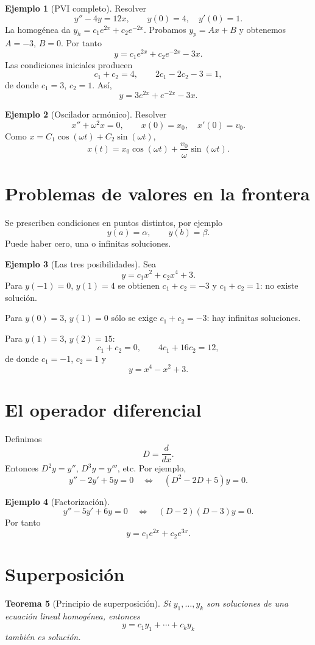 \documentclass[11pt]{article}
\newtheorem{teorema}{Teorema}[section]
\theoremstyle{definition}
\newtheorem{ejemplo}[teorema]{Ejemplo}
\begin{document}
\begin{ejemplo}[PVI completo]
Resolver
\[
y''-4y=12x,\qquad y(0)=4,\quad y'(0)=1.
\]
La homogénea da $y_h=c_1e^{2x}+c_2e^{-2x}$. Probamos $y_p=Ax+B$ y obtenemos
$A=-3$, $B=0$. Por tanto
\[
y=c_1e^{2x}+c_2e^{-2x}-3x.
\]
Las condiciones iniciales producen
\[
c_1+c_2=4,\qquad 2c_1-2c_2-3=1,
\]
de donde $c_1=3$, $c_2=1$. Así,
\[
\boxed{y=3e^{2x}+e^{-2x}-3x}.
\]
\end{ejemplo}

\begin{ejemplo}[Oscilador armónico]
Resolver
\[
x''+\omega^2x=0,\qquad x(0)=x_0,\quad x'(0)=v_0.
\]
Como $x=C_1\cos(\omega t)+C_2\sin(\omega t)$,
\[
\boxed{x(t)=x_0\cos(\omega t)+\frac{v_0}{\omega}\sin(\omega t)}.
\]
\end{ejemplo}

\section{Problemas de valores en la frontera}
Se prescriben condiciones en puntos distintos, por ejemplo
\[
y(a)=\alpha,\qquad y(b)=\beta.
\]
Puede haber cero, una o infinitas soluciones.

\begin{ejemplo}[Las tres posibilidades]
Sea
\[
y=c_1x^2+c_2x^4+3.
\]
Para $y(-1)=0$, $y(1)=4$ se obtienen $c_1+c_2=-3$ y $c_1+c_2=1$: no existe solución.

Para $y(0)=3$, $y(1)=0$ sólo se exige $c_1+c_2=-3$: hay infinitas soluciones.

Para $y(1)=3$, $y(2)=15$:
\[
c_1+c_2=0,\qquad 4c_1+16c_2=12,
\]
de donde $c_1=-1$, $c_2=1$ y
\[
\boxed{y=x^4-x^2+3}.
\]
\end{ejemplo}

\section{El operador diferencial}
Definimos
\[
D=\frac{d}{dx}.
\]
Entonces $D^2y=y''$, $D^3y=y'''$, etc. Por ejemplo,
\[
y''-2y'+5y=0
\quad\Longleftrightarrow\quad
(D^2-2D+5)y=0.
\]

\begin{ejemplo}[Factorización]
\[
y''-5y'+6y=0
\quad\Longleftrightarrow\quad
(D-2)(D-3)y=0.
\]
Por tanto
\[
\boxed{y=c_1e^{2x}+c_2e^{3x}}.
\]
\end{ejemplo}

\section{Superposición}
\begin{teorema}[Principio de superposición]
Si $y_1,\ldots,y_k$ son soluciones de una ecuación lineal homogénea, entonces
\[
y=c_1y_1+\cdots+c_ky_k
\]
también es solución.
\end{teorema}
\end{document}
